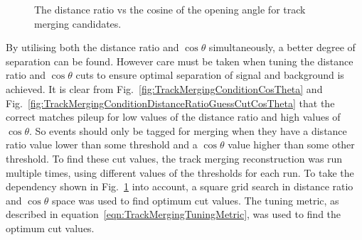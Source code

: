 \begin{figure}[b!]
  \centering
  \caption{The distance ratio vs the cosine of the opening angle for track merging candidates.}
  \label{fig:TrackMergingConditionDistanceRatioVsCosTheta}
\end{figure}
\newline
\newline
By utilising both the distance ratio and $\cos\theta$ simultaneously, a better degree of separation can be found.  However care must be taken when tuning the distance ratio and $\cos\theta$ cuts to ensure optimal separation of signal and background is achieved.  It is clear from Fig.~\ref{fig:TrackMergingConditionCosTheta} and Fig.~\ref{fig:TrackMergingConditionDistanceRatioGuessCutCosTheta} that the correct matches pileup for low values of the distance ratio and high values of $\cos\theta$.  So events should only be tagged for merging when they have a distance ratio value lower than some threshold and a $\cos\theta$ value higher than some other threshold. To find these cut values, the track merging reconstruction was run multiple times, using different values of the thresholds for each run.  To take the dependency shown in Fig.~\ref{fig:TrackMergingConditionDistanceRatioVsCosTheta} into account, a square grid search in distance ratio and $\cos\theta$ space was used to find optimum cut values.  The tuning metric, as described in equation~\ref{eqn:TrackMergingTuningMetric}, was used to find the optimum cut values.
